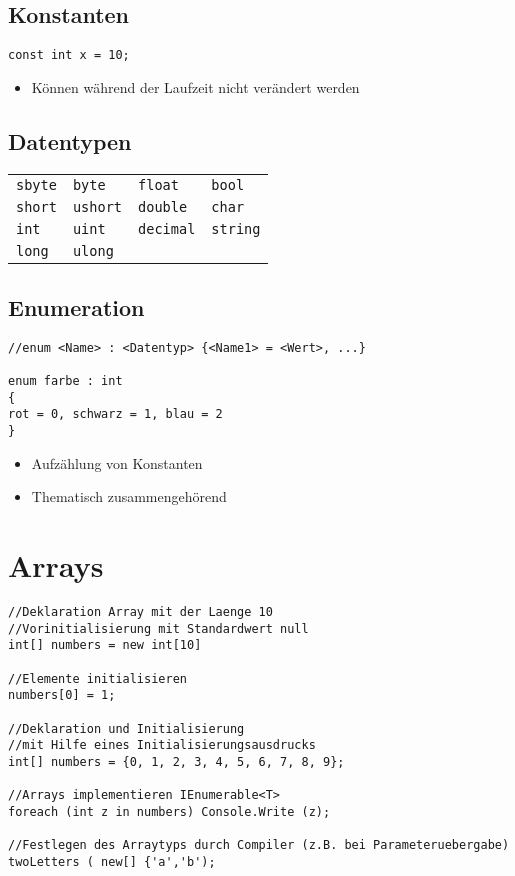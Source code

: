 \subsection{Konstanten}
\begin{lstlisting}
const int x = 10;
\end{lstlisting}
\begin{itemize}
\item Können während der Laufzeit nicht verändert werden
\end{itemize}
\subsection{Datentypen}
\begin{tabular}{p{3cm}p{3cm}p{3cm}p{3cm}}
\texttt{sbyte}	&\texttt{byte}	&\texttt{float}	&\texttt{bool}\\
\texttt{short}	&\texttt{ushort}	&\texttt{double}	&\texttt{char}\\
\texttt{int}		&\texttt{uint}	&\texttt{decimal} &\texttt{string}\\
\texttt{long}	&\texttt{ulong}	&&\\
\end{tabular}
\subsection{Enumeration}
\begin{lstlisting}
//enum <Name> : <Datentyp> {<Name1> = <Wert>, ...}

enum farbe : int 
{
rot = 0, schwarz = 1, blau = 2
}
\end{lstlisting}
\begin{itemize}
\item Aufzählung von Konstanten
\item Thematisch zusammengehörend
\end{itemize}
\section{Arrays}
\begin{lstlisting}
//Deklaration Array mit der Laenge 10
//Vorinitialisierung mit Standardwert null
int[] numbers = new int[10]

//Elemente initialisieren
numbers[0] = 1;		

//Deklaration und Initialisierung
//mit Hilfe eines Initialisierungsausdrucks
int[] numbers = {0, 1, 2, 3, 4, 5, 6, 7, 8, 9};

//Arrays implementieren IEnumerable<T>
foreach (int z in numbers) Console.Write (z);

//Festlegen des Arraytyps durch Compiler (z.B. bei Parameteruebergabe)
twoLetters ( new[] {'a','b');
\end{lstlisting}
